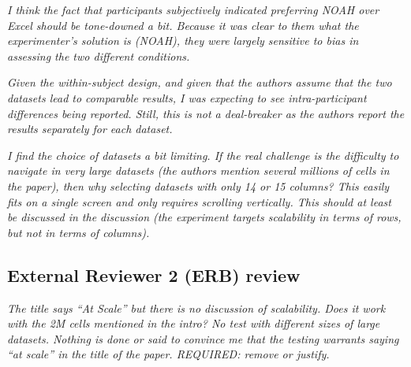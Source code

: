  \textit{I think the fact that participants subjectively indicated preferring NOAH over Excel should be tone-downed a bit. Because it was clear to them what the
    experimenter's solution is (NOAH), they were largely sensitive to bias in
    assessing the two different conditions.}

 


 \textit{Given the within-subject design, and given that the authors assume that the two datasets lead to comparable results, I was expecting to see intra-participant
    differences being reported. Still, this is not a deal-breaker as the authors report the results separately for each dataset.}

  

 \textit{I find the choice of datasets a bit limiting. If the real challenge is the
    difficulty to navigate in very large datasets (the authors mention several
    millions of cells in the paper), then why selecting datasets with only 14 or 15 columns? This easily fits on a single screen and only requires scrolling
    vertically. This should at least be discussed in the discussion (the experiment targets scalability in terms of rows, but not in terms of columns).}


\subsection*{External Reviewer 2 (ERB) review}

 \textit{The title says “At Scale”  but there is no discussion of scalability. Does it work
    with the 2M cells mentioned in the intro?  No test with different sizes of large
    datasets.  Nothing is done or said to convince me that the testing warrants saying
    “at scale” in the title of the paper.
    REQUIRED: remove or justify.}

